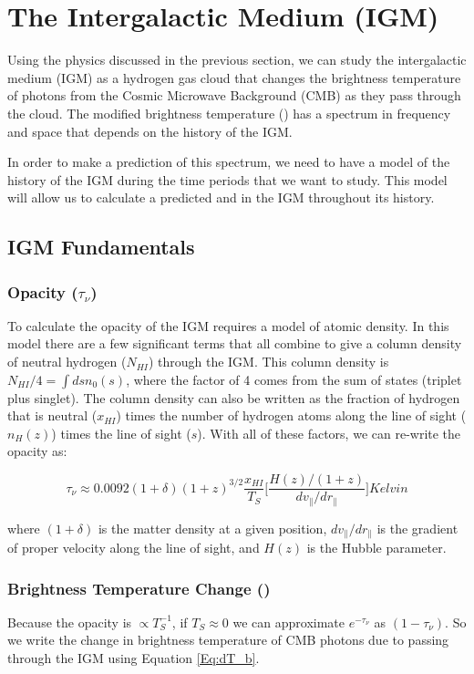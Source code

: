 \section{The Intergalactic Medium (IGM)}\label{Sec:IGM}
Using the physics discussed in the previous section, we can study the intergalactic medium (IGM) as a hydrogen gas cloud that changes the brightness temperature of photons from the Cosmic Microwave Background (CMB) as they pass through the cloud. The modified brightness temperature (\dtb) has a spectrum in frequency and space that depends on the history of the IGM. 

In order to make a prediction of this spectrum, we need to have a model of the history of the IGM during the time periods that we want to study. This model will allow us to calculate a predicted \ts and \tu in the IGM throughout its history. 

\subsection{IGM Fundamentals}
\subsubsection{Opacity ($\tau_\nu$)}
To calculate the opacity of the IGM requires a model of atomic density. In this model there are a few significant terms that all combine to give a column density of neutral hydrogen ($N_{HI}$) through the IGM. This column density is $N_{HI}/4 = \int ds n_0 (s)$, where the factor of 4 comes from the sum of states (triplet plus singlet). The column density can also be written as the fraction of hydrogen that is neutral ($x_{HI}$) times the number of hydrogen atoms along the line of sight ($n_H (z)$) times the line of sight ($s$). With all of these factors, we can re-write the opacity as:

\begin{equation}
\tau_{\nu} \approx 0.0092 (1+\delta) (1+z)^{3/2} \frac{x_{HI}}{T_S} \Big[ \frac{H(z)/(1+z)}{dv_{\parallel}/dr_{\parallel}} \Big] Kelvin
\end{equation} 

where $(1+\delta)$ is the matter density at a given position, $dv_{\parallel}/dr_{\parallel}$ is the gradient of proper velocity along the line of sight, and $H(z)$ is the Hubble parameter. 

\subsubsection{Brightness Temperature Change (\dtb)}
Because the opacity is $\propto T^{-1}_S$, if $T_S \approx 0$ we can approximate $e^{-\tau_\nu}$ as $(1-\tau_\nu)$. So we write the change in brightness temperature of CMB photons due to passing through the IGM using Equation \ref{Eq:dT_b}.

